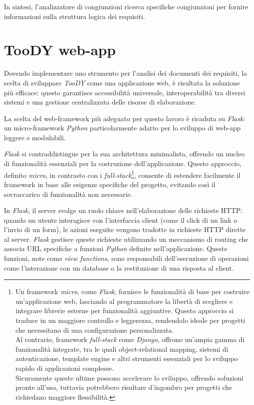 \documentclass[12pt]{report}
\newcommand{\toody}{\textsl{TooDY}\xspace}
\newcommand{\python}{\textsl{Python}\xspace}
\newcommand{\flask}{\textsl{Flask}\xspace}
\newcommand{\django}{\textsl{Django}\xspace}
\newcommand{\URL}{\textsf{URL}\xspace}
\newcommand{\http}{\textsf{HTTP}\xspace}
\begin{document}
In sintesi, l'\textsf{analizzatore di congiunzioni} ricerca specifiche congiunzioni per fornire informazioni sulla struttura logica dei requisiti.


\clearpage\thispagestyle{empty}
\null\newpage




\chapter{TooDY web-app}
\label{sec:architettura}
Dovendo implementare uno strumento per l'analisi dei documenti dei requisiti, la scelta di sviluppare \toody come una applicazione web, è risultata la soluzione più efficace: questo garantisce accessibilità universale, interoperabilità tra diversi sistemi e una gestione centralizzata delle risorse di elaborazione.

La scelta del web-framework più adeguato per questo lavoro è ricaduta su \flask: un micro-framework \python particolarmente adatto per lo sviluppo di web-app leggere e modulabili.

\flask si contraddistingue per la sua architettura minimalista, offrendo un nucleo di funzionalità essenziali per la costruzione dell'applicazione. Questo approccio, definito \textit{micro}, in contrasto con i \textit{full-stack}\footnote{Un framework \textit{micro}, come \flask, fornisce le funzionalità di base per costruire un'applicazione web, lasciando al programmatore la libertà di scegliere e integrare librerie esterne per funzionalità aggiuntive. Questo approccio si traduce in un maggiore controllo e leggerezza, rendendolo ideale per progetti che necessitano di una configurazione personalizzata.\\
Al contrario, framework \textit{full-stack} come \django, offrono un'ampia gamma di funzionalità integrate, tra le quali object-relational mapping, sistemi di autenticazione, template engine e altri strumenti essenziali per lo sviluppo rapido di applicazioni complesse.\\
Sicuramente queste ultime possono accelerare lo sviluppo, offrendo soluzioni pronte all'uso, tuttavia potrebbero risultare d'ingombro per progetti che richiedano maggiore flessibilità.}, consente di estendere facilmente il framework in base alle esigenze specifiche del progetto, evitando così il sovraccarico di funzionalità non necessarie.

In \flask, il server svolge un ruolo chiave nell'elaborazione delle richieste \http: quando un utente interagisce con l'interfaccia client (come il click di un link o l'invio di un form), le azioni eseguite vengono tradotte in richieste \http dirette al server. \flask gestisce queste richieste utilizzando un meccanismo di routing che associa \URL specifiche a funzioni \python definite nell'applicazione. Queste funzioni, note come \textit{view functions}, sono responsabili dell'esecuzione di operazioni come l'interazione con un database o la restituzione di una risposta al client.
\end{document}
